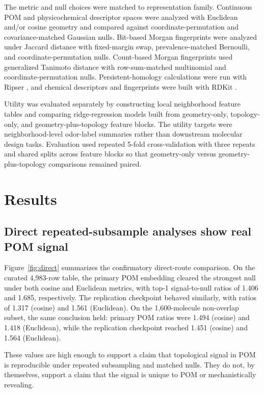 \documentclass[11pt]{article}
\begin{document}
The metric and null choices were matched to representation family. Continuous POM and physicochemical descriptor spaces were analyzed with Euclidean and/or cosine geometry and compared against coordinate-permutation and covariance-matched Gaussian nulls. Bit-based Morgan fingerprints \cite{morgan1965generation} were analyzed under Jaccard distance with fixed-margin swap, prevalence-matched Bernoulli, and coordinate-permutation nulls. Count-based Morgan fingerprints used generalized Tanimoto distance with row-sum-matched multinomial and coordinate-permutation nulls. Persistent-homology calculations were run with Ripser \cite{bauer2021ripser}, and chemical descriptors and fingerprints were built with RDKit \cite{landrum2006rdkit}.

Utility was evaluated separately by constructing local neighborhood feature tables and comparing ridge-regression models built from geometry-only, topology-only, and geometry-plus-topology feature blocks. The utility targets were neighborhood-level odor-label summaries rather than downstream molecular design tasks. Evaluation used repeated 5-fold cross-validation with three repeats and shared splits across feature blocks so that geometry-only versus geometry-plus-topology comparisons remained paired.

\section{Results}

\subsection{Direct repeated-subsample analyses show real POM signal}

Figure~\ref{fig:direct} summarizes the confirmatory direct-route comparison. On the curated 4,983-row table, the primary POM embedding cleared the strongest null under both cosine and Euclidean metrics, with top-1 signal-to-null ratios of 1.406 and 1.685, respectively. The replication checkpoint behaved similarly, with ratios of 1.317 (cosine) and 1.561 (Euclidean). On the 1,600-molecule non-overlap subset, the same conclusion held: primary POM ratios were 1.494 (cosine) and 1.418 (Euclidean), while the replication checkpoint reached 1.451 (cosine) and 1.564 (Euclidean).

These values are high enough to support a claim that topological signal in POM is reproducible under repeated subsampling and matched nulls. They do not, by themselves, support a claim that the signal is unique to POM or mechanistically revealing.
\end{document}
